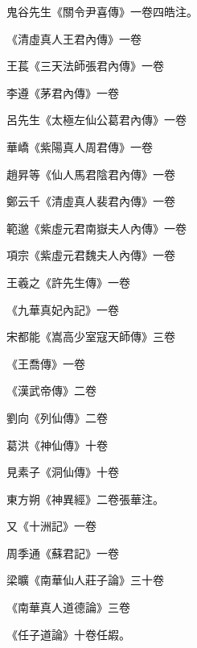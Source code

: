 \begin{pinyinscope}
 鬼谷先生《關令尹喜傳》一卷四皓注。



 《清虛真人王君內傳》一卷



 王萇《三天法師張君內傳》一卷



 李遵《茅君內傳》一卷



 呂先生《太極左仙公葛君內傳》一卷



 華嶠《紫陽真人周君傳》一卷



 趙昇等《仙人馬君陰君內傳》一卷



 鄭云千《清虛真人裴君內傳》一卷



 範邈《紫虛元君南嶽夫人內傳》一卷



 項宗《紫虛元君魏夫人內傳》一卷



 王羲之《許先生傳》一卷



 《九華真妃內記》一卷



 宋都能《嵩高少室寇天師傳》三卷



 《王喬傳》一卷



 《漢武帝傳》二卷



 劉向《列仙傳》二卷



 葛洪《神仙傳》十卷



 見素子《洞仙傳》十卷



 東方朔《神異經》二卷張華注。



 又《十洲記》一卷



 周季通《蘇君記》一卷



 梁曠《南華仙人莊子論》三十卷



 《南華真人道德論》三卷



 《任子道論》十卷任嘏。




\end{pinyinscope}
